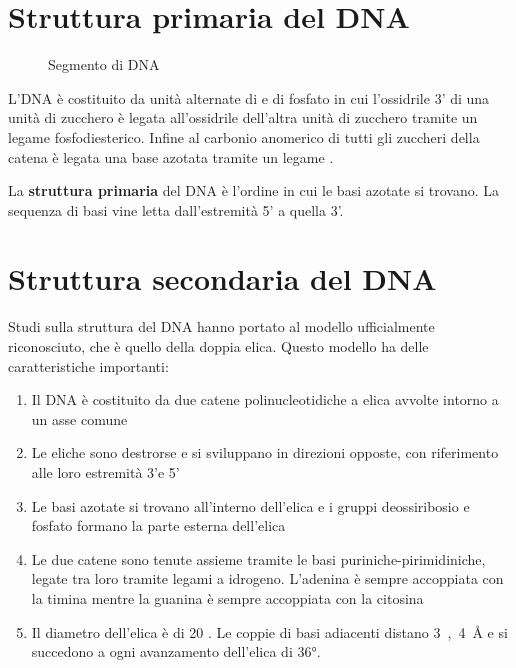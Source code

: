 \section{Struttura primaria del DNA}
\begin{wrapfigure}[10]{l}{0.4\textwidth}
	\centering
	\vspace{-20pt}
	\caption{Segmento di DNA}
	\vspace{-10pt}
\end{wrapfigure}
L'\acl{DNA} è costituito da unità alternate di  e di fosfato in cui l'ossidrile 3' di una unità di zucchero è legata all'ossidrile dell'altra unità di zucchero tramite un legame fosfodiesterico. Infine al carbonio anomerico di tutti gli zuccheri della catena è legata una base azotata tramite un legame .

La \textbf{struttura primaria} del DNA è l'ordine in cui le basi azotate si trovano. La sequenza di basi vine letta dall'estremità 5' a quella 3'.


\section{Struttura secondaria del DNA}
Studi sulla struttura del \ac{DNA} hanno portato al modello ufficialmente riconosciuto, che è quello della doppia elica. Questo modello ha delle caratteristiche importanti:
\begin{enumerate}
	\item Il \ac{DNA} è costituito da due catene polinucleotidiche a elica avvolte intorno a un asse comune
	\item Le eliche sono destrorse e si sviluppano in direzioni opposte, con riferimento alle loro estremità 3'e 5'
	\item Le basi azotate si trovano all'interno dell'elica e i gruppi deossiribosio e fosfato formano la parte esterna dell'elica
	\item Le due catene sono tenute assieme tramite le basi puriniche-pirimidiniche, legate tra loro tramite legami a idrogeno. L'adenina è sempre accoppiata con la timina mentre la guanina è sempre accoppiata con la citosina
	\item Il diametro dell'elica è di 20 \angstrom. Le coppie di basi adiacenti distano \unit{3,4 \angstrom} e si succedono a ogni avanzamento dell'elica di \ang{36}.
\end{enumerate}

